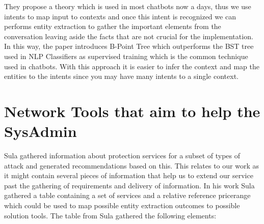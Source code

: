 They propose a theory which is used in most chatbots now a days, thus we use intents to map input to contexts and once this intent is recognized we can performs entity extraction to gather the important elements from the conversation leaving aside the facts that are not crucial for the implementation. In this way, the paper introduces B-Point Tree which outperforms the BST tree used in NLP Classifiers as supervised training which is the common technique used in chatbots. With this approach it is easier to infer the context and map the entities to the intents since you may have many intents to a single context.

\section{Network Tools that aim to help the SysAdmin}

Sula gathered information about protection services for a subset of types of attack and generated recommendations based on this. This relates to our work as it might contain several pieces of information that help us to extend our service past the gathering of requirements and delivery of information. In his work Sula gathered a table containing a set of services and a relative reference pricerange which could be used to map possible entity extraction outcomes to possible solution tools. The table from Sula \cite{recomendationSystem} gathered the following elements:


